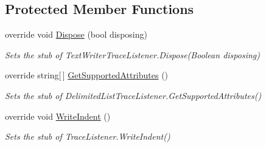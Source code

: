 \subsection*{Protected Member Functions}
\begin{DoxyCompactItemize}
\item 
override void \hyperlink{class_system_1_1_diagnostics_1_1_fakes_1_1_stub_delimited_list_trace_listener_a73460adfa2d1cac6c01ccdeddcbcd86c}{Dispose} (bool disposing)
\begin{DoxyCompactList}\small\item\em Sets the stub of Text\-Writer\-Trace\-Listener.\-Dispose(\-Boolean disposing)\end{DoxyCompactList}\item 
override string\mbox{[}$\,$\mbox{]} \hyperlink{class_system_1_1_diagnostics_1_1_fakes_1_1_stub_delimited_list_trace_listener_aa7762b6f5615c693ff07fb39e424fc1f}{Get\-Supported\-Attributes} ()
\begin{DoxyCompactList}\small\item\em Sets the stub of Delimited\-List\-Trace\-Listener.\-Get\-Supported\-Attributes()\end{DoxyCompactList}\item 
override void \hyperlink{class_system_1_1_diagnostics_1_1_fakes_1_1_stub_delimited_list_trace_listener_a6837609594e525f0cf7dce6283cc2d56}{Write\-Indent} ()
\begin{DoxyCompactList}\small\item\em Sets the stub of Trace\-Listener.\-Write\-Indent()\end{DoxyCompactList}\end{DoxyCompactItemize}
